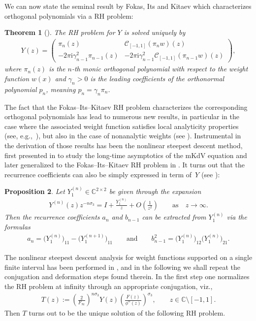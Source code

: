 \documentclass[11pt]{article}
\numberwithin{equation}{section}
\newcommand{\C}{\mathbb{C}}
\newcommand{\Id}{I}
\newcommand{\I}{\mathrm{i}}
\newtheorem{Theorem}{Theorem}[section]
\newtheorem{Proposition}[Theorem]{Proposition}
 { \theoremstyle{definition}
\newtheorem{Definition}[Theorem]{Definition}
\newtheorem{Note}[Theorem]{Note}
\newtheorem{Example}[Theorem]{Example}
\newtheorem{Remark}[Theorem]{Remark} }
\numberwithin{equation}{section}
\begin{document}
We can now state the seminal result by Fokas, Its and Kitaev which characterizes orthogonal polynomials via a RH problem:
\begin{Theorem}[\cite{FIK}]
The RH problem for $Y$ is solved uniquely by
\begin{align*}
Y(z) =
\begin{pmatrix}
\pi_n(z) & \mathcal{C}_{[-1,1]}(\pi_n w)(z)
\\
-2\pi\I\gamma^2_{n-1} \pi_{n-1}(z) & -2\pi\I\gamma^2_{n-1} \mathcal{C}_{[-1,1]}(\pi_{n-1} w)(z)
\end{pmatrix},
\end{align*}
where $\pi_n(z)$ is the $n$-th monic orthogonal polynomial with respect to the weight function $w(x)$ and $\gamma_n > 0$ is the leading coefficients of the orthonormal polynomial $p_n$, meaning $p_n = \gamma_n \pi_n$.
\end{Theorem}

The fact that the Fokas--Its--Kitaev RH problem characterizes the corresponding orthogonal polynomials has lead to numerous new results, in particular in the case where the associated weight function satisfies local analyticity properties (see, e.g.,~\cite{BI,PD,DKMVZ1,DKMVZ2,KMVV}), but also in the case of nonanalytic weights (see \cite{BY10,KMcL99,McM06,McM08,MY23}). Instrumental in the derivation of those results has been the nonlinear steepest descent method, first presented in \cite{DZ93} to study the long-time asymptotics of the mKdV equation and later generalized to the Fokas--Its--Kitaev RH problem in \cite{BI,DKMVZ1,DKMVZ2}. It turns out that the recurrence coefficients can also be simply expressed in term of~$Y$ (see \cite{PD}):
\begin{Proposition}\label{Yab}
 Let $Y_1^{(n)} \in \C^{2\times2}$ be given through the expansion
 \begin{align*}
 Y^{(n)}(z)z^{-n\sigma_3} = \Id + \frac{Y_1^{(n)}}{z} + O\left(\frac{1}{z^2}\right) \qquad \text{as} \quad z\to\infty.
 \end{align*}
Then the recurrence coefficients $a_n$ and $b_{n-1}$ can be extracted from $Y_1^{(n)}$ via the formulas
\begin{align*}
 a_n = \big(Y_1^{(n)}\big)_{11}-\big(Y_1^{(n+1)}\big)_{11}
\qquad \text{and}\qquad b_{n-1}^2 = \big(Y_1^{(n)}\big)_{12} \big(Y_1^{(n)}\big)_{21}.
\end{align*}
\end{Proposition}

The nonlinear steepest descent analysis for weight functions supported on a single finite interval has been performed in \cite{KMVV}, and in the following we shall repeat the conjugation and deformation steps found therein. In the first step one normalizes the RH problem at infinity through an appropriate conjugation, viz.,
\begin{align} \label{TY}
 T(z) := \left(\frac{2}{F_\infty}\right)^{n\sigma_3} Y(z) \left(\frac{F(z)}{\phi^n(z)}\right)^{\sigma_3}, \qquad z \in \C \setminus [-1,1].
\end{align}
Then $T$ turns out to be the unique solution of the following RH problem.
\end{document}
